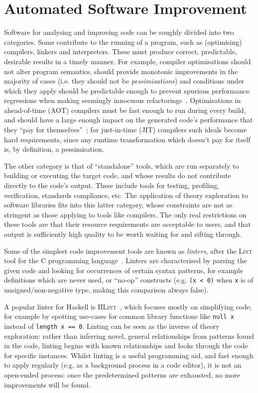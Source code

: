 \section{Automated Software Improvement}

Software for analysing and improving code can be roughly divided into two
categories. Some contribute to the running of a program, such as (optimising)
compilers, linkers and interpreters. These must produce correct, predictable,
desirable results in a timely manner. For example, compiler optimisations should
not alter program semantics, should provide monotonic improvements in the
majority of cases (i.e. they should not be \emph{pessimisations}) and conditions
under which they apply should be predictable enough to prevent spurious
performance regressions when making seemingly innocuous
refactorings~\cite{robison2001impact}. Optimisations in ahead-of-time (AOT)
compilers must be fast enough to run during every build, and should have a large
enough impact on the generated code's performance that they
``pay for themselves''~\cite{Franz1994}; for just-in-time (JIT) compilers such
ideals become hard requirements, since any runtime transformation which doesn't
pay for itself is, by definition, a pessimisation.

The other category is that of ``standalone'' tools, which are run separately to
building or executing the target code, and whose results do not contribute
directly to the code's output. These include tools for testing, profiling,
verification, standards compliance, etc. The application of theory exploration
to software libraries fits into this latter category, whose constraints are not
as stringent as those applying to tools like compilers. The only real
restrictions on these tools are that their resource requirements are acceptable
to users, and that output is sufficiently high quality to be worth waiting for
and sifting through.

Some of the simplest code improvement tools are known as \emph{linters}, after
the \textsc{Lint} tool for the C programming language~\cite{Johnson78lint}.
Linters are characterised by parsing the given code and looking for occurrences
of certain syntax patterns, for example definitions which are never used, or
``no-op'' constructs (e.g. \texttt{(x~<~0)} when \texttt{x} is of
unsigned/non-negative type, making this comparison always false).

A popular linter for Haskell is \textsc{HLint}~\cite{mitchell2014hlint}, which
focuses mostly on simplifying code; for example by spotting use-cases for common
library functions like \texttt{null x} instead of \texttt{length x == 0}.
Linting can be seen as the inverse of theory exploration: rather than inferring
novel, general relationships from patterns found in the code, linting begins
with known relationships and looks through the code for specific instances.
Whilst linting is a useful programming aid, and fast enough to apply regularly
(e.g. as a background process in a code editor), it is not an open-ended
process: once the predetermined patterns are exhausted, no more improvements
will be found.

